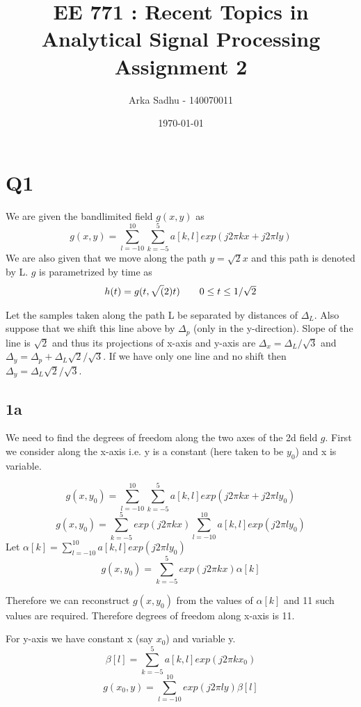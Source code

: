 \documentclass{article}
\title{EE 771 : Recent Topics in Analytical Signal Processing Assignment 2}
\author{Arka Sadhu - 140070011}
\date{\today}
\begin{document}
\maketitle

\section*{Q1}
We are given the bandlimited field $g(x, y)$ as
$$g(x,y) = \sum_{l=-10}^{10}\sum_{k=-5}^{5} a[k, l] exp(j2\pi kx + j2\pi ly)$$
We are also given that we move along the path $y = \sqrt{2}x$ and this path is denoted by L. $g$ is parametrized by time as
\begin{align}
  \label{eq:1}
  h(t) = g(t, \sqrt(2)t) \tag*{$0 \le t \le 1/\sqrt{2}$}
\end{align}

Let the samples taken along the path L be separated by distances of $\Delta_L$. Also suppose that we shift this line above by $\Delta_p$ (only in the y-direction). Slope of the line is $\sqrt{2}$ and thus its projections of x-axis and y-axis are $\Delta_x = \Delta_L / \sqrt{3} $ and $\Delta_y = \Delta_p + \Delta_L \sqrt{2} / \sqrt{3}$. If we have only one line and no shift then $\Delta_y = \Delta_L \sqrt{2} / \sqrt{3}$.

\subsection*{1a}
We need to find the degrees of freedom along the two axes of the 2d field $g$. First we consider along the x-axis i.e. y is a constant (here taken to be $y_0$) and x is variable.

$$g(x, y_0) = \sum_{l=-10}^{10} \sum_{k=-5}^5a[k, l] exp(j2 \pi kx + j2\pi ly_0)$$
$$g(x, y_0) = \sum_{k=-5}^{5} exp(j2 \pi kx) \sum_{l=-10}^{10} a[k, l] exp(j2\pi ly_0)$$
Let $\alpha [k] = \sum_{l=-10}^{10}a[k, l] exp(j2\pi ly_0)$
\begin{equation}
  \label{eq:gy0}
  g(x, y_0) = \sum_{k=-5}^{5} exp(j2 \pi kx) \alpha[k]
\end{equation}

Therefore we can reconstruct $g(x, y_0)$ from the values of $\alpha[k]$ and 11 such values are required. Therefore degrees of freedom along x-axis is 11.

For y-axis we have constant x (say $x_0$) and variable y.
$$\beta[l] = \sum_{k=-5}^5 a[k,l] exp(j2\pi kx_0)$$
\begin{equation}
  \label{eq:gx0}
  g(x_0, y) = \sum_{l=-10}^{10}exp(j2 \pi ly) \beta[l]
\end{equation}
\end{document}

